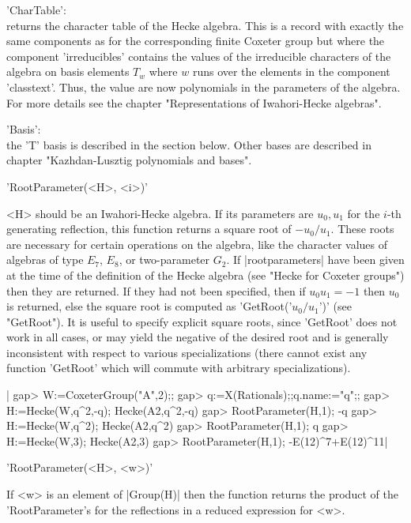 'CharTable':\\ returns the character table  of the Hecke algebra. This is
     a record with  exactly the same  components as for the corresponding
     finite Coxeter group but where the component 'irreducibles' contains
     the values  of the irreducible characters   of the algebra  on basis
     elements $T_w$ where  $w$ runs  over  the elements in the  component
     'classtext'. Thus, the value  are now polynomials in the  parameters
     of the algebra.  For  more details see the  chapter "Representations
     of Iwahori-Hecke algebras".

'Basis':\\ the 'T' basis is described in  the section below.  Other bases
     are described in chapter "Kazhdan-Lusztig polynomials and bases".


'RootParameter(<H>, <i>)'

<H>  should be an  Iwahori-Hecke algebra. If  its parameters are $u_0, u_1$
for  the $i$-th generating reflection, this  function returns a square root
of  $-u_0/u_1$. These  roots are  necessary for  certain operations  on the
algebra,  like the  character values  of algebras  of type $E_7$, $E_8$, or
two-parameter $G_2$. If |rootparameters| have been given at the time of the
definition  of the Hecke algebra (see "Hecke for Coxeter groups") then they
are  returned. If  they had  not been  specified, then  if $u_0u_1=-1$ then
$u_0$ is returned, else the square root is computed as
'GetRoot('$u_0/u_1$')'  (see "GetRoot").  It is  useful to specify explicit
square  roots, since 'GetRoot' does not work in all cases, or may yield the
negative  of the desired root and is generally inconsistent with respect to
various  specializations (there  cannot exist  any function 'GetRoot' which
will commute with arbitrary specializations).

|    gap> W:=CoxeterGroup("A",2);;
    gap> q:=X(Rationals);;q.name:="q";;
    gap> H:=Hecke(W,q^2,-q);
    Hecke(A2,q^2,-q)
    gap> RootParameter(H,1);
    -q
    gap> H:=Hecke(W,q^2);
    Hecke(A2,q^2)
    gap> RootParameter(H,1);
    q
    gap> H:=Hecke(W,3);
    Hecke(A2,3)
    gap> RootParameter(H,1);
    -E(12)^7+E(12)^11|

'RootParameter(<H>, <w>)'

If <w> is an element of |Group(H)| then the function returns the product of
the 'RootParameter's for the reflections in a reduced expression for <w>.

